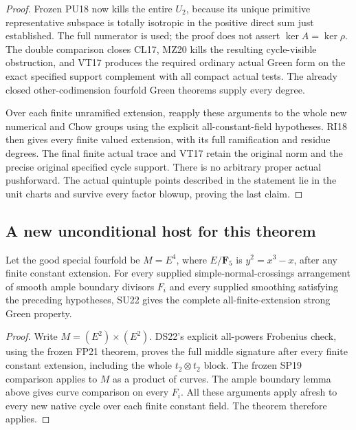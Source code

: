 \begin{proof}
Frozen PU18 now kills the entire $U_2$, because its unique
primitive representative subspace is totally isotropic in the
positive direct sum just established.  The full numerator is
used; the proof does not assert $\ker A=\ker\rho$.
The double comparison closes CL17, MZ20 kills the resulting
cycle-visible obstruction, and VT17 produces the required
ordinary actual Green form on the exact specified support
complement with all compact actual tests.  The already closed
other-codimension fourfold Green theorems supply every degree.

Over each finite unramified extension, reapply these arguments
to the whole new numerical and Chow groups using the explicit
all-constant-field hypotheses.  RI18 then gives every finite
valued extension, with its full ramification and residue
degrees.  The final finite actual trace and VT17 retain the
original norm and the precise original specified cycle support.
There is no arbitrary proper actual pushforward.  The actual
quintuple points described in the statement lie in the unit
charts and survive every factor blowup, proving the last claim.
\end{proof}

\subsection{A new unconditional host for this theorem}

\begin{corollary}
\label{r22su:host}
Let the good special fourfold be $M=E^4$, where
$E/\mathbf F_5$ is $y^2=x^3-x$, after any finite constant
extension.  For every supplied simple-normal-crossings
arrangement of smooth ample boundary divisors $F_i$ and every
supplied smoothing satisfying the preceding hypotheses, SU22
gives the complete all-finite-extension strong Green property.
\end{corollary}

\begin{proof}
Write $M=(E^2)\times(E^2)$.  DS22's explicit all-powers
Frobenius check, using the frozen FP21 theorem, proves the
full middle signature after every finite constant extension,
including the whole $t_2\otimes t_2$ block.  The frozen SP19
comparison applies to $M$ as a product of curves.  The ample
boundary lemma above gives curve comparison on every $F_i$.
All these arguments apply afresh to every new native cycle
over each finite constant field.  The theorem therefore applies.
\end{proof}


